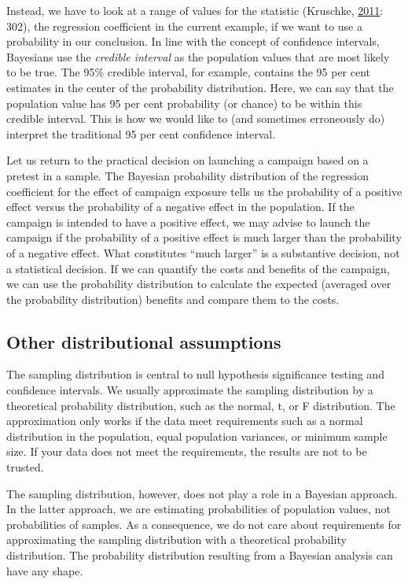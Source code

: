 \documentclass[
  english,
  doc]{apa6}
\begin{document}
Instead, we have to look at a range of values for the statistic (Kruschke, \protect\hyperlink{ref-kruschkeBayesianAssessmentNull2011}{2011}: 302), the regression coefficient in the current example, if we want to use a probability in our conclusion. In line with the concept of confidence intervals, Bayesians use the \emph{credible interval} as the population values that are most likely to be true. The 95\% credible interval, for example, contains the 95 per cent estimates in the center of the probability distribution. Here, we can say that the population value has 95 per cent probability (or chance) to be within this credible interval. This is how we would like to (and sometimes erroneously do) interpret the traditional 95 per cent confidence interval.

Let us return to the practical decision on launching a campaign based on a pretest in a sample. The Bayesian probability distribution of the regression coefficient for the effect of campaign exposure tells us the probability of a positive effect versus the probability of a negative effect in the population. If the campaign is intended to have a positive effect, we may advise to launch the campaign if the probability of a positive effect is much larger than the probability of a negative effect. What constitutes ``much larger'' is a substantive decision, not a statistical decision. If we can quantify the costs and benefits of the campaign, we can use the probability distribution to calculate the expected (averaged over the probability distribution) benefits and compare them to the costs.

\hypertarget{assumptions}{%
\subsection{Other distributional assumptions}\label{assumptions}}

The sampling distribution is central to null hypothesis significance testing and confidence intervals. We usually approximate the sampling distribution by a theoretical probability distribution, such as the normal, t, or F distribution. The approximation only works if the data meet requirements such as a normal distribution in the population, equal population variances, or minimum sample size. If your data does not meet the requirements, the results are not to be trusted.

The sampling distribution, however, does not play a role in a Bayesian approach. In the latter approach, we are estimating probabilities of population values, not probabilities of samples. As a consequence, we do not care about requirements for approximating the sampling distribution with a theoretical probability distribution. The probability distribution resulting from a Bayesian analysis can have any shape.
\end{document}
